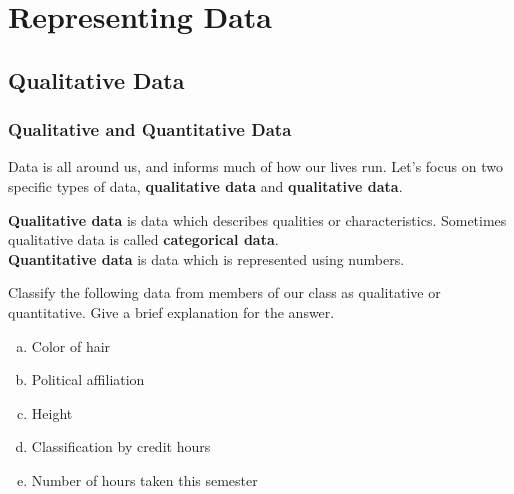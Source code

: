 \documentclass[notes]{subfiles}
\begin{document}
	\chapter{Representing Data}
	\setcounter{section}{1}
	\setcounter{page}{1}
	\fancyhead[LO,RE]{\bfseries \currentname}
	\fancyfoot[C]{{}}
	\fancyfoot[RO,LE]{\large \thepage}	%

\section*{Qualitative Data}\label{qualdata}
	\subsection*{Qualitative and Quantitative Data}	
		Data is all around us, and informs much of how our lives run.  Let's focus on two specific types of data, \textbf{qualitative data} and \textbf{qualitative data}.

		\begin{defn}
			\textbf{Qualitative data} is data which describes qualities or characteristics.  Sometimes qualitative data is called \textbf{categorical data}.\\[15pt]
	
			\textbf{Quantitative data} is data which is represented using numbers.
		\end{defn}
		
		\begin{ex}
			Classify the following data from members of our class as qualitative or quantitative.  Give a brief explanation for the answer.
			\begin{enumerate}[(a)]
				\item Color of hair
	
				\item Political affiliation
	
				\item Height
	
				\item Classification by credit hours
	
				\item Number of hours taken this semester
			\end{enumerate}
		\end{ex}
			\newpage
	
\end{document}
